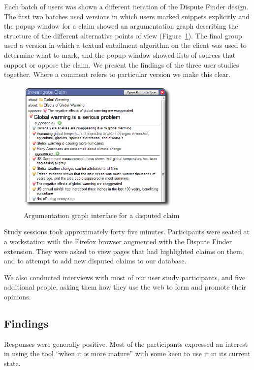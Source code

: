 \documentclass{www2010-submission}
\newcommand{\todo}[1]{}
\begin{document}
Each batch of users was shown a different iteration of the Dispute Finder design. The first two batches used versions in which users marked snippets explicitly and the popup window for a claim showed an argumentation graph describing the structure of the different alternative points of view (Figure~\ref{popup_graph}). The final group used a version in which a textual entailment algorithm on the client was used to determine what to mark, and the popup window showed lists of sources that support or oppose the claim. We present the findings of the three user studies together. Where a comment refers to particular version we make this clear.

\begin{figure}[tb]
	\begin{center}
	\includegraphics[width=8cm]{pictures/popup_graph_crop.png}
	\caption{Argumentation graph interface for a disputed claim}
	\label{popup_graph}
	\end{center}
\end{figure}


Study sessions took approximately forty five minutes. Participants were seated at a workstation with the Firefox browser augmented with the Dispute Finder extension. They were asked to view pages that had highlighted claims on them, and to attempt to add new disputed claims to our database.

We also conducted interviews with most of our user study participants, and five additional people, asking them how they use the web to form and promote their opinions.

\todo{Need to finish the third wave of user studies}

\subsection{Findings}

Responses were generally positive. Most of the participants expressed an interest in using the tool ``when it is more mature'' with some keen to use it in its current state.
\end{document}

